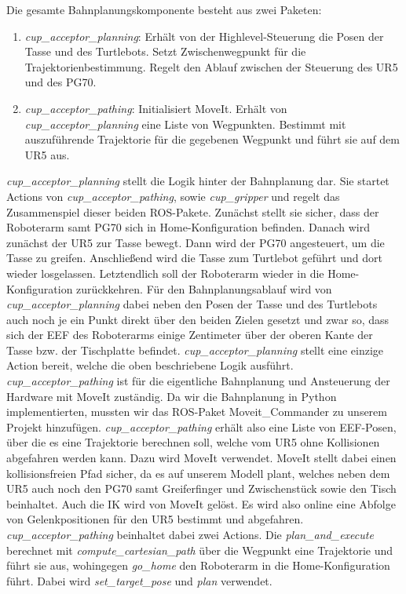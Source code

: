 Die gesamte Bahnplanungskomponente besteht aus zwei Paketen:
\begin{enumerate}
	\item \textit{cup\_acceptor\_planning}:
				\newline
				Erhält von der Highlevel-Steuerung die Posen der Tasse und des Turtlebots. Setzt Zwischenwegpunkt für die Trajektorienbestimmung. Regelt den Ablauf zwischen der Steuerung des UR5 und des PG70.
	\item \textit{cup\_acceptor\_pathing}:
				\newline
				Initialisiert MoveIt. Erhält von \textit{cup\_acceptor\_planning} eine Liste von Wegpunkten. Bestimmt mit auszuführende Trajektorie für die gegebenen Wegpunkt und führt sie auf dem UR5 aus.
\end{enumerate}
\textit{cup\_acceptor\_planning} stellt die Logik hinter der Bahnplanung dar. Sie startet Actions von \textit{cup\_acceptor\_pathing}, sowie \textit{cup\_gripper} und regelt das Zusammenspiel dieser beiden ROS-Pakete. Zunächst stellt sie sicher, dass der Roboterarm samt PG70 sich in Home-Konfiguration befinden. Danach wird zunächst der UR5 zur Tasse bewegt. Dann wird der PG70 angesteuert, um die Tasse zu greifen. Anschließend wird die Tasse zum Turtlebot geführt und dort wieder losgelassen. Letztendlich soll der Roboterarm wieder in die Home-Konfiguration zurückkehren. Für den Bahnplanungsablauf wird von \textit{cup\_acceptor\_planning} dabei neben den Posen der Tasse und des Turtlebots auch noch je ein Punkt direkt über den beiden Zielen gesetzt und zwar so, dass sich der EEF des Roboterarms einige Zentimeter über der oberen Kante der Tasse bzw. der Tischplatte befindet. \textit{cup\_acceptor\_planning} stellt eine einzige Action bereit, welche die oben beschriebene Logik ausführt. 
\newline
\textit{cup\_acceptor\_pathing} ist für die eigentliche Bahnplanung und Ansteuerung der Hardware mit MoveIt zuständig. Da wir die Bahnplanung in Python implementierten, mussten wir das ROS-Paket \glqq Moveit\_Commander\grqq \cite{MoveItCommander} zu unserem Projekt hinzufügen. \textit{cup\_acceptor\_pathing} erhält also eine Liste von EEF-Posen, über die es eine Trajektorie berechnen soll, welche vom UR5 ohne Kollisionen abgefahren werden kann. Dazu wird MoveIt verwendet. MoveIt stellt dabei einen kollisionsfreien Pfad sicher, da es auf unserem Modell plant, welches neben dem UR5 auch noch den PG70 samt Greiferfinger und Zwischenstück sowie den Tisch beinhaltet. Auch die IK wird von MoveIt gelöst. Es wird also online eine Abfolge von Gelenkpositionen für den UR5 bestimmt und abgefahren. \textit{cup\_acceptor\_pathing} beinhaltet dabei zwei Actions. Die \textit{plan\_and\_execute} berechnet mit \textit{compute\_cartesian\_path} über die Wegpunkt eine Trajektorie und führt sie aus, wohingegen \textit{go\_home} den Roboterarm in die Home-Konfiguration führt. Dabei wird \textit{set\_target\_pose} und \textit{plan} verwendet.
